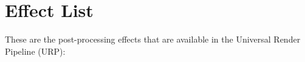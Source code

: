 \chapter{Effect List}
\hypertarget{md__hey_tea_9_2_library_2_package_cache_2com_8unity_8render-pipelines_8universal_0d14_80_88_2_documentation_0i_2_effect_list}{}\label{md__hey_tea_9_2_library_2_package_cache_2com_8unity_8render-pipelines_8universal_0d14_80_88_2_documentation_0i_2_effect_list}
\label{md__hey_tea_9_2_library_2_package_cache_2com_8unity_8render-pipelines_8universal_0d14_80_88_2_documentation_0i_2_effect_list_autotoc_md2110}%
%
 These are the post-\/processing effects that are available in the Universal Render Pipeline (URP)\+:


